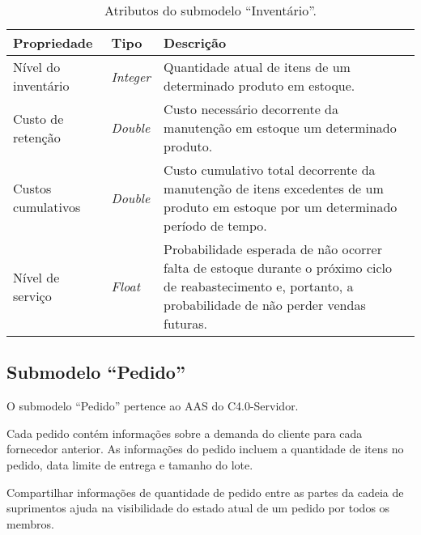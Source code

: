 \begin{table}[htb]
	\centering
	\caption{Atributos do submodelo ``Inventário''.}
	\begin{tabular}{p{3.5cm}p{1.5cm}p{9cm}}
		\hline
		\textbf{Propriedade}
		 & \textbf{Tipo}
		 & \textbf{Descrição}                                                                                                                                           \\

		\hline
		Nível do inventário
		 & \textit{Integer}
		 & Quantidade atual de itens de um determinado produto em estoque.                                                                                              \\

		\hline
		Custo de retenção
		 & \textit{Double}
		 & Custo necessário decorrente da manutenção em estoque um determinado produto.                                                                                 \\

		\hline
		Custos cumulativos
		 & \textit{Double}
		 & Custo cumulativo total decorrente da manutenção de itens excedentes de um produto em estoque por um determinado período de tempo.                            \\

		\hline
		Nível de serviço
		 & \textit{Float}
		 & Probabilidade esperada de não ocorrer falta de estoque durante o próximo ciclo de reabastecimento e, portanto, a probabilidade de não perder vendas futuras. \\

		\hline
	\end{tabular}
	\label{tab:submodelo-inventario}
\end{table}

\newpage

\subsection{Submodelo ``Pedido''}

O submodelo ``Pedido'' pertence ao AAS do C4.0-Servidor.

Cada pedido contém informações sobre a demanda do cliente para cada fornecedor anterior. As informações do pedido incluem a quantidade de itens no pedido, data limite de entrega e tamanho do lote.

Compartilhar informações de quantidade de pedido entre as partes da cadeia de suprimentos ajuda na visibilidade do estado atual de um pedido por todos os membros.

